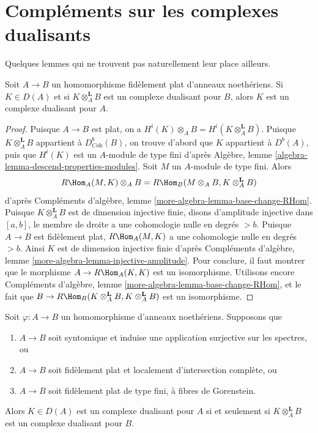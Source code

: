 \section{Compléments sur les complexes dualisants}
\label{section-more-dualizing}

\noindent
Quelques lemmes qui ne trouvent pas naturellement leur place ailleurs.

\begin{lemma}
\label{lemma-descent}
Soit $A \to B$ un homomorphisme fidèlement plat d'anneaux noethériens.
Si $K \in D(A)$ et si $K \otimes_A^\mathbf{L} B$ est un complexe dualisant pour $B$,
alors $K$ est un complexe dualisant pour $A$.
\end{lemma}

\begin{proof}
Puisque $A \to B$ est plat, on a $H^i(K) \otimes_A B = H^i(K \otimes_A^\mathbf{L} B)$.
Puisque $K \otimes_A^\mathbf{L} B$ appartient à $D^b_{\textit{Coh}}(B)$, on trouve d'abord que $K$ appartient à $D^b(A)$,
puis que $H^i(K)$ est un $A$-module de type fini d'après Algèbre, lemme \ref{algebra-lemma-descend-properties-modules}.
Soit $M$ un $A$-module de type fini. Alors
$$
R\Hom_A(M, K) \otimes_A B = R\Hom_B(M \otimes_A B, K \otimes_A^\mathbf{L} B)
$$
d'après Compléments d'algèbre, lemme \ref{more-algebra-lemma-base-change-RHom}.
Puisque $K \otimes_A^\mathbf{L} B$ est de dimension injective finie,
disons d'amplitude injective dans $[a, b]$,
le membre de droite a une cohomologie nulle en degrés $> b$.
Puisque $A \to B$ est fidèlement plat, $R\Hom_A(M, K)$ a une cohomologie nulle en degrés $> b$.
Ainsi $K$ est de dimension injective finie
d'après Compléments d'algèbre, lemme \ref{more-algebra-lemma-injective-amplitude}.
Pour conclure, il faut montrer que le morphisme $A \to R\Hom_A(K, K)$ est un isomorphisme.
Utilisons encore Compléments d'algèbre, lemme \ref{more-algebra-lemma-base-change-RHom},
et le fait que
$B \to R\Hom_B(K \otimes_A^\mathbf{L} B, K \otimes_A^\mathbf{L} B)$
est un isomorphisme.
\end{proof}

\begin{lemma}
\label{lemma-descent-ascent}
Soit $\varphi : A \to B$ un homomorphisme d'anneaux noethériens. Supposons que
\begin{enumerate}
\item $A \to B$ soit syntomique et induise une application surjective sur les spectres, ou
\item $A \to B$ soit fidèlement plat et localement d'intersection complète, ou
\item $A \to B$ soit fidèlement plat de type fini, à fibres de Gorenstein.
\end{enumerate}
Alors $K \in D(A)$ est un complexe dualisant pour $A$ si et seulement si
$K \otimes_A^\mathbf{L} B$ est un complexe dualisant pour $B$.
\end{lemma}


